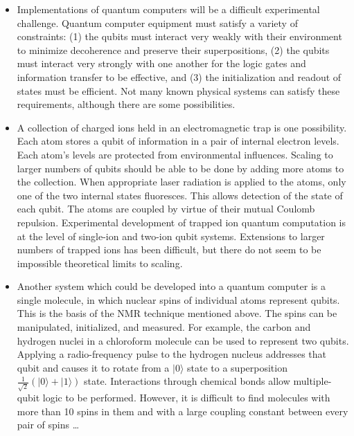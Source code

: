 \documentclass{article}
\def\pagedone{\newpage}
\def\ket#1{|{#1}\rangle}
\begin{document}
\begin{itemize}
\item Implementations of quantum computers will be a difficult experimental challenge. Quantum computer equipment must satisfy a variety of constraints: (1) the qubits must interact
very weakly with their environment to minimize decoherence and preserve their superpositions, (2) the qubits must interact very strongly with one another for the logic gates and information transfer to be effective, and (3) the initialization and readout of states must be efficient. Not many known physical systems can satisfy these requirements, although there are some possibilities.
\pagedone
\item A collection of charged ions held in an electromagnetic trap is one possibility. Each atom stores a qubit of information in a pair of internal electron levels. Each atom's levels are protected from environmental influences. Scaling to larger numbers of qubits should be able to be done by adding more atoms to the collection.  When appropriate laser radiation is applied to the atoms, only one of the two internal states fluoresces.  This allows detection of the state of each qubit. The atoms are coupled by virtue of their mutual Coulomb repulsion.  Experimental development of trapped ion quantum computation is at the level of single-ion and two-ion qubit systems. Extensions to larger
numbers of trapped ions has been difficult, but there do not seem to be impossible theoretical limits to scaling. 
\pagedone
\item Another system which could be developed into a quantum computer is a single molecule, in which nuclear spins of individual atoms represent qubits. This is the basis of the NMR technique mentioned above. The spins can be manipulated, initialized, and measured. For example, the carbon and hydrogen nuclei in a chloroform
molecule can be used to represent two qubits. Applying a radio-frequency pulse to the hydrogen nucleus addresses that qubit and causes it to rotate from a $\ket 0$ state to a superposition $\frac{1}{\sqrt{2}}(\ket 0 + \ket 1)$ state. Interactions
through chemical bonds allow multiple-qubit logic to be performed.  However, it is difficult to find molecules with more than 10 spins in them and with a large coupling constant between every pair of spins \ldots
\end{itemize}

\pagedone
\end{document}
